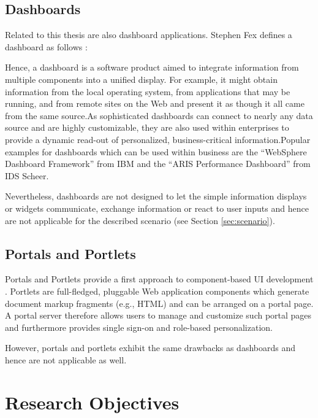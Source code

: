 \subsection{Dashboards}
Related to this thesis are also dashboard applications. Stephen Fex defines a dashboard as follows
\cite{stephen_few}:


Hence, a dashboard is a software product aimed to integrate information from multiple components into
a unified display. For example, it might obtain information from the local operating system, from
applications that may be running, and from remote sites on the Web and present it as though it all
came from the same source.\newline As sophisticated dashboards can connect to nearly any data source
and are highly customizable, they are also used within enterprises to provide a dynamic read-out of
personalized, business-critical information.\newline Popular examples for dashboards which can be
used within business are the ``WebSphere Dashboard Framework''
\cite{websphere_dashboard} from IBM and the ``ARIS Performance Dashboard'' \cite{aris_dashboard}
from IDS Scheer.

Nevertheless, dashboards are not designed to let the simple information displays or widgets
communicate, exchange information or react to user inputs and hence are not applicable for the
described scenario (see Section \ref{sec:scenario}).

\subsection{Portals and Portlets}
Portals and Portlets provide a first approach to component-based UI development \cite{portlets}.
Portlets are full-fledged, pluggable Web application components which generate document markup
fragments (e.g., HTML) and can be arranged on a portal page. A portal server therefore allows users
to manage and customize such portal pages and furthermore provides single sign-on and role-based
personalization.

However, portals and portlets exhibit the same drawbacks as dashboards and hence are not applicable
as well.

\section{Research Objectives}
\label{sec:research_objectives}

